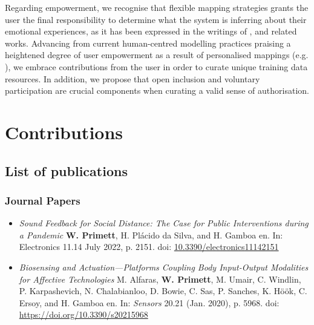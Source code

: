 Regarding empowerment, we recognise that flexible mapping strategies grants the user the final responsibility to determine what the system is inferring about their emotional experiences, as it has been expressed in the writings of \citeauthor{stahl_evocative_2014} \cite{stahl_evocative_2014}, and related works. Advancing from current human-centred modelling practices praising a heightened degree of user empowerment as a result of personalised mappings (e.g. \cite{carney_teachable_2020}), we embrace contributions from the user in order to curate unique training data resources. In addition, we propose that open inclusion and voluntary participation are crucial components when curating a valid sense of authorisation.

\section{Contributions}

\subsection{List of publications}

\subsubsection{Journal Papers}

\begin{itemize}
    \item[] \textit{Sound Feedback for Social Distance: The Case for Public Interventions during a Pandemic}
    \textbf{W. Primett}, H. Plácido da Silva, and H. Gamboa
    en. In: Electronics 11.14 July 2022, p. 2151. doi:
    \url{10.3390/electronics11142151}

    \item[] \textit{Biosensing and Actuation—Platforms Coupling Body Input-Output Modalities for Affective Technologies}
    M. Alfaras, \textbf{W. Primett}, M. Umair, C. Windlin, P. Karpashevich, N. Chalabianloo, D. Bowie, C. Sas, P. Sanches, K. Höök, C. Ersoy, and H. Gamboa
    en. In: \textit{Sensors} 20.21 (Jan. 2020), p. 5968. doi: \url{https://doi.org/10.3390/s20215968}
\end{itemize}

